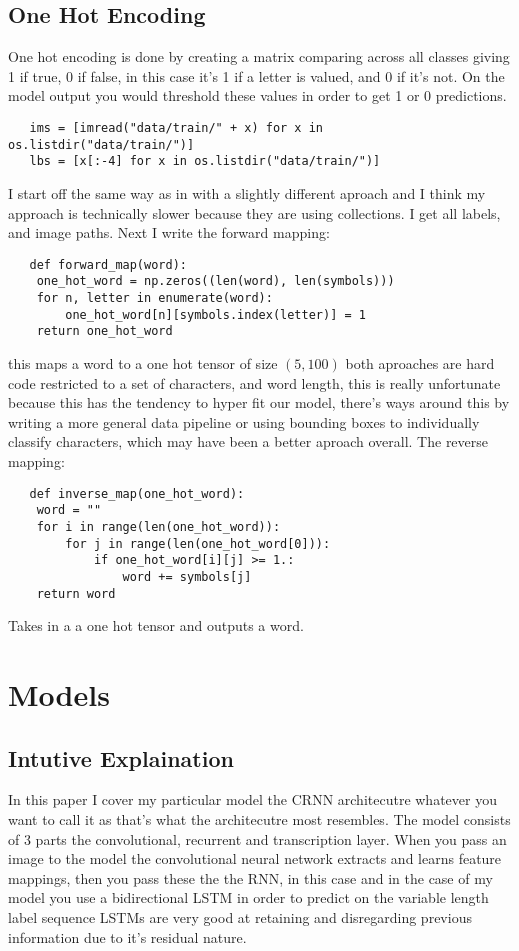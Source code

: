 \documentclass[11pt]{article}
\begin{document}
\subsection{One Hot Encoding}
One hot encoding is done by creating a matrix comparing across all classes giving 1 if true, 0 if false, in this case it's 1 if a letter is valued, and 0 if it's not. On the model output you would threshold these values in order to get 1 or 0 predictions.
\begin{verbatim}
   ims = [imread("data/train/" + x) for x in os.listdir("data/train/")]
   lbs = [x[:-4] for x in os.listdir("data/train/")]
\end{verbatim}
I start off the same way as in \cite{a2019} with a slightly different aproach and I think my approach is technically slower because they are using collections. I get all labels, and image paths. Next I write the forward mapping:
\begin{verbatim}
   def forward_map(word):
    one_hot_word = np.zeros((len(word), len(symbols)))
    for n, letter in enumerate(word):
        one_hot_word[n][symbols.index(letter)] = 1
    return one_hot_word
\end{verbatim}
this maps a word to a one hot tensor of size $(5, 100)$ both aproaches are hard code restricted to a set of characters, and word length, this is really unfortunate because this has the tendency to hyper fit our model, there's ways around this by writing a more general data pipeline or using bounding boxes to individually classify characters, which may have been a better aproach overall. The reverse mapping:
\begin{verbatim}
   def inverse_map(one_hot_word):
    word = ""
    for i in range(len(one_hot_word)):
        for j in range(len(one_hot_word[0])):
            if one_hot_word[i][j] >= 1.:
                word += symbols[j]
    return word
\end{verbatim}
Takes in a a one hot tensor and outputs a word.

\section{Models}
\subsection{Intutive Explaination}
In this paper I cover my particular model the CRNN architecutre whatever you want to call it as that's what the architecutre most resembles. The model consists of 3 parts the convolutional, recurrent and transcription layer. When you pass an image to the model the convolutional neural network extracts and learns feature mappings, then you pass these the the RNN, in this case and in the case of my model you use a bidirectional LSTM in order to predict on the variable length label sequence LSTMs are very good at retaining and disregarding previous information due to it's residual nature. \cite{feng2019} 
\end{document}
